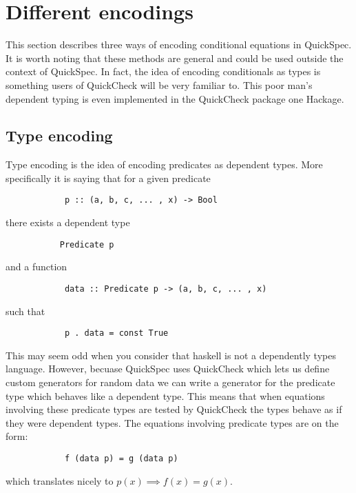 \section{Different encodings}\label{encodings}

    This section describes three
    ways of encoding conditional
    equations in QuickSpec. It is
    worth noting that these methods
    are general and could be used outside
    the context of QuickSpec. In fact,
    the idea of encoding conditionals
    as types is something users of
    QuickCheck %
    will be very familiar to. This poor
    man's dependent typing is even implemented
    in the QuickCheck package one Hackage.%

    \subsection{Type encoding}

        Type encoding is the idea of encoding
        predicates as dependent types. More specifically
        it is saying that for a given predicate
        \begin{verbatim}
            p :: (a, b, c, ... , x) -> Bool
        \end{verbatim}
        there exists a dependent type
        \begin{verbatim}
           Predicate p
        \end{verbatim}
        and a function 
        \begin{verbatim}
            data :: Predicate p -> (a, b, c, ... , x)
        \end{verbatim}
        such that 
        \begin{verbatim}
            p . data = const True
        \end{verbatim}
        This may seem odd when you consider that haskell is not a dependently types
        language. However, becuase QuickSpec uses QuickCheck which lets us define
        custom generators for random data we can write a generator for 
        the predicate type which behaves like a dependent type.
        This means that when equations involving these predicate
        types are tested by QuickCheck the types behave as if they were dependent types.
        The equations involving predicate types are on the form:
        \begin{verbatim}
            f (data p) = g (data p)
        \end{verbatim}
        which translates nicely to $p(x) \implies f(x) = g(x)$.

